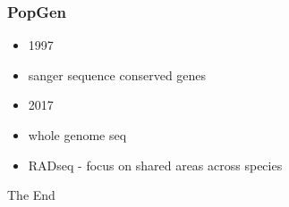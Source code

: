 \documentclass[14pt]{beamer}
\begin{document}
\begin{frame}
\frametitle{PopGen}
	\begin{itemize}
		\item 1997
		\item sanger sequence conserved genes
		\item 2017
		\item whole genome seq
		\item RADseq - focus on shared areas across species
	\end{itemize}
\end{frame}

\begin{frame}
\Huge{\centerline{The End}}
\end{frame}

\end{document}
